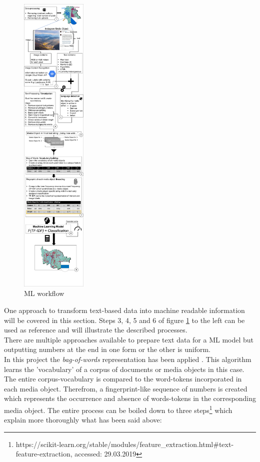 \begin{figure} %
    \centerline{\includegraphics[trim={0 0 0 0},clip,width=0.28\textwidth]{img/ML_text_data_visualization_cropped.pdf}}
  \caption{ML workflow}
  \label{fig:ml_visualisation}
\end{figure}

One approach to transform text-based data into machine readable information will be covered in this section. Steps 3, 4, 5 and 6 of figure \ref{fig:ml_visualisation} to the left can be used as reference and will illustrate the described processes.\\
There are multiple approaches available to prepare text data for a ML model but outputting numbers at the end in one form or the other is uniform.\\
In this project the \textit{bag-of-words} representation has been applied \parencite{Joulin2016}. This algorithm learns the 'vocabulary' of a corpus of documents or media objects in this case. The entire corpus-vocabulary is compared to the word-tokens incorporated in each media object. Therefrom, a fingerprint-like sequence of numbers is created which represents the occurrence and absence of words-tokens in the corresponding media object. The entire process can be boiled down to three steps\footnote{https://scikit-learn.org/stable/modules/feature\_extraction.html\#text-feature-extraction, accessed: 29.03.2019} which explain more thoroughly what has been said above:

